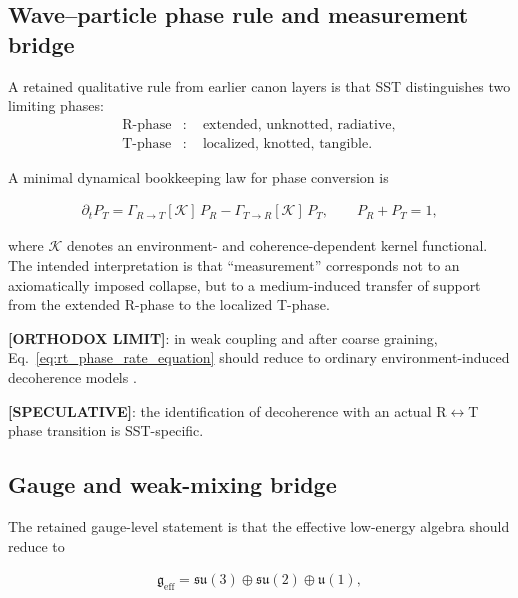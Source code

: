 \documentclass[11pt]{article}
\theoremstyle{definition}
\theoremstyle{plain}
\theoremstyle{remark}
\begin{document}
    \subsection{Wave--particle phase rule and measurement bridge}
        \label{subsec:measurement_bridge}

        A retained qualitative rule from earlier canon layers is that SST distinguishes two limiting phases:
        \begin{align}
            \text{R-phase} &:\quad \text{extended, unknotted, radiative}, \\
            \text{T-phase} &:\quad \text{localized, knotted, tangible}.
        \end{align}

        A minimal dynamical bookkeeping law for phase conversion is

        \begin{align}
            \partial_t P_T
            =
            \Gamma_{R\to T}[\mathcal{K}]\,P_R
            -
            \Gamma_{T\to R}[\mathcal{K}]\,P_T,
            \qquad
            P_R + P_T = 1,
            \label{eq:rt_phase_rate_equation}
        \end{align}

        where $\mathcal{K}$ denotes an environment- and coherence-dependent kernel functional. The intended interpretation is that ``measurement'' corresponds not to an axiomatically imposed collapse, but to a medium-induced transfer of support from the extended R-phase to the localized T-phase.

        \textbf{[ORTHODOX LIMIT]}: in weak coupling and after coarse graining, Eq.~\eqref{eq:rt_phase_rate_equation} should reduce to ordinary environment-induced decoherence models \cite{Zurek2003}.

        \textbf{[SPECULATIVE]}: the identification of decoherence with an actual R$\leftrightarrow$T phase transition is SST-specific.

    \subsection{Gauge and weak-mixing bridge}
        \label{subsec:gauge_weakmix_bridge}

        The retained gauge-level statement is that the effective low-energy algebra should reduce to

        \begin{align}
            \mathfrak{g}_{\mathrm{eff}} = \mathfrak{su}(3)\oplus\mathfrak{su}(2)\oplus\mathfrak{u}(1),
            \label{eq:effective_gauge_algebra}
        \end{align}
\end{document}
